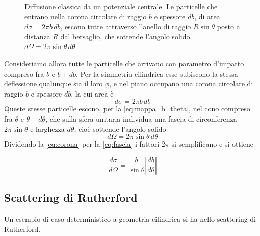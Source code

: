 \begin{figure}[htbp]
    \caption{Diffusione classica da un potenziale centrale. Le particelle che entrano nella corona circolare di raggio $b$ e spessore $db$, di area $d\sigma = 2\pi b\,db$, escono tutte attraverso l'anello di raggio $R\sin\theta$ posto a distanza $R$ dal bersaglio, che sottende l'angolo solido $d\Omega = 2\pi\sin\theta\,d\theta$.}
    \label{fig:scattering_classico}
\end{figure}

Consideriamo allora tutte le particelle che arrivano con parametro d'impatto compreso fra $b$ e $b+db$. Per la simmetria cilindrica esse subiscono la stessa deflessione qualunque sia il loro $\phi$, e nel piano occupano una corona circolare di raggio $b$ e spessore $db$, la cui area è
%
\begin{equation}
    d\sigma = 2\pi b \, db
    \label{eq:corona}
\end{equation}
Queste stesse particelle escono, per la \eqref{eq:mappa_b_theta}, nel cono compreso fra $\theta$ e $\theta+d\theta$, che sulla sfera unitaria individua una fascia di circonferenza $2\pi\sin\theta$ e larghezza $d\theta$, cioè sottende l'angolo solido
%
\begin{equation}
    d\Omega = 2\pi \sin\theta \, d\theta
    \label{eq:fascia}
\end{equation}
Dividendo la \eqref{eq:corona} per la \eqref{eq:fascia} i fattori $2\pi$ si semplificano e si ottiene

\begin{tcolorbox}[colback=black!5!white, colframe=black!45!white, boxrule=0.8pt]
\begin{equation}
    \frac{d\sigma}{d\Omega} = \frac{b}{\sin\theta}\left|\frac{db}{d\theta}\right|
    \label{eq:sezione_classica}
\end{equation}
\end{tcolorbox}

\newpage

\subsection*{Scattering di Rutherford}

Un esempio di caso deterministico a geometria cilindrica si ha nello scattering di Rutherford. 

